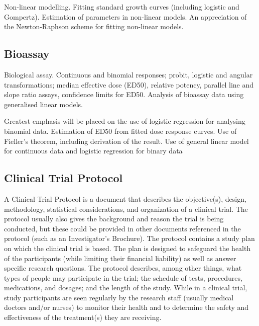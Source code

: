 Non-linear modelling. Fitting standard growth curves (including logistic and Gompertz).
Estimation of parameters in non-linear models.
An appreciation of the Newton-Raphson scheme for fitting non-linear models.
 
\subsection*{Bioassay}
Biological assay. Continuous and binomial responses; probit, logistic and angular transformations;
median effective dose (ED50), relative potency, parallel line and slope ratio assays, confidence limits for ED50. Analysis of bioassay data using generalised linear models.
 
Greatest emphasis will be placed on the use of logistic regression for analysing binomial data.
Estimation of ED50 from fitted dose response curves. Use of Fieller's theorem, including
derivation of the result. Use of general linear model for continuous data and logistic regression for binary data
 
\subsection*{Clinical Trial Protocol}
 
A Clinical Trial Protocol is a document that describes the objective(s), design, methodology, statistical considerations, and organization of a clinical trial. The protocol usually also gives the background and reason the trial is being conducted, but these could be provided in other documents referenced in the protocol (such as an Investigator's Brochure).
The protocol contains a study plan on which the clinical trial is based. The plan is designed to safeguard the health of the participants (while limiting their financial liability) as well as answer specific research questions. The protocol describes, among other things, what types of people may participate in the trial; the schedule of tests, procedures, medications, and dosages; and the length of the study. While in a clinical trial, study participants are seen regularly by the research staff (usually medical doctors and/or nurses) to monitor their health and to determine the safety and effectiveness of the treatment(s) they are receiving.
 
